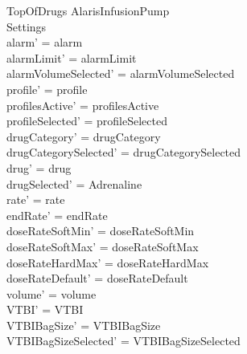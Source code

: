 \begin{schema}{TopOfDrugs}
	\Delta AlarisInfusionPump\\
	 Settings\\
	\where
	alarm' = alarm\\
	alarmLimit' = alarmLimit\\
	alarmVolumeSelected' = alarmVolumeSelected\\
	profile' = profile\\
	profilesActive' = profilesActive\\  
	  profileSelected' = profileSelected\\
	drugCategory' = drugCategory\\ drugCategorySelected' = drugCategorySelected\\
	drug' = drug\\ 
	drugSelected' = Adrenaline\\
	rate' = rate\\
	endRate' = endRate\\
	\pagebreak 
	doseRateSoftMin' = doseRateSoftMin\\
	doseRateSoftMax' = doseRateSoftMax\\
	doseRateHardMax' = doseRateHardMax\\
	doseRateDefault' = doseRateDefault\\
	volume' = volume\\
	VTBI' = VTBI\\
	VTBIBagSize' = VTBIBagSize\\ VTBIBagSizeSelected' = VTBIBagSizeSelected\\

\end{schema}
